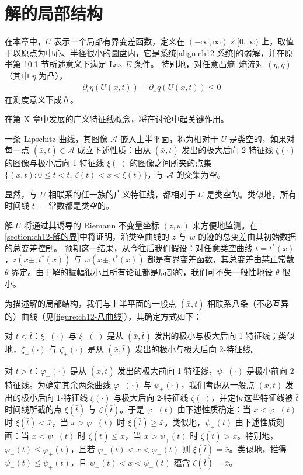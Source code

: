 \documentclass[../../main.tex]{subfiles}
\begin{document}
\section{解的局部结构}\label{section:ch12-解的局部结构}

在本章中，$U$ 表示一个局部有界变差函数，定义在 $(-\infty,\infty)\times[0,\infty)$ 上，取值于以原点为中心、半径很小的圆盘内，它是系统\eqref{align:ch12-系统}的弱解，并在原书第 10.1 节所述意义下满足 Lax $E$-条件。
特别地，对任意凸熵--熵流对 $(\eta,q)$（其中 $\eta$ 为凸），
\begin{align}
\partial_t\eta(U(x,t))+\partial_x q(U(x,t))\leqslant 0
\label{align:ch12-熵不等式}
\end{align}
在测度意义下成立。

在第 X 章中发展的广义特征线概念，将在讨论中起关键作用。

\begin{definition}[类空曲线]\label{definition:ch12-类空曲线}
一条 Lipschitz 曲线，其图像 $\mathscr{A}$ 嵌入上半平面，称为相对于 $U$ 是类空的，如果对每一点 $(\bar x,\bar t)\in\mathscr{A}$ 成立下述性质：由从 $(\bar x,\bar t)$ 发出的极大后向 2-特征线 $\zeta(\cdot)$ 的图像与极小后向 1-特征线 $\xi(\cdot)$ 的图像之间所夹的点集 $\{(x,t):0\leqslant t<\bar t,\ \zeta(t)<x<\xi(t)\}$，与 $\mathscr{A}$ 的交集为空。
\end{definition}

显然，与 $U$ 相联系的任一族的广义特征线，都相对于 $U$ 是类空的。类似地，所有时间线 $t=$ 常数都是类空的。

解 $U$ 将通过其诱导的 Riemann 不变量坐标 $(z,w)$ 来方便地监测。在\cref{section:ch12-解的界}中将证明，沿类空曲线的 $z$ 与 $w$ 的迹的总变差由其初始数据的总变差控制。
预期这一结果，从今往后我们假设：对任意类空曲线 $t=t^*(x)$，$z(x\pm,t^*(x))$ 与 $w(x\pm,t^*(x))$ 都是有界变差函数，其总变差由某正常数 $\theta$ 界定。由于解的振幅很小且所有论证都是局部的，我们可不失一般性地设 $\theta$ 很小。

为描述解的局部结构，我们与上半平面的一般点 $(\bar x,\bar t)$ 相联系八条（不必互异的）曲线（见\cref{figure:ch12-八曲线}），其确定方式如下：

对 $t<\bar t$：$\xi_-(\cdot)$ 与 $\xi_+(\cdot)$ 是从 $(\bar x,\bar t)$ 发出的极小与极大后向 1-特征线；类似地，$\zeta_-(\cdot)$ 与 $\zeta_+(\cdot)$ 是从 $(\bar x,\bar t)$ 发出的极小与极大后向 2-特征线。

对 $t>\bar t$：$\varphi_+(\cdot)$ 是从 $(\bar x,\bar t)$ 发出的极大前向 1-特征线，$\psi_-(\cdot)$ 是极小前向 2-特征线。为确定其余两条曲线 $\varphi_-(\cdot)$ 与 $\psi_+(\cdot)$，我们考虑从一般点 $(x,t)$ 发出的极小后向 1-特征线 $\xi(\cdot)$ 与极大后向 2-特征线 $\zeta(\cdot)$，并定位这些特征线被 $\bar t$ 时间线所截的点 $\xi(\bar t)$ 与 $\zeta(\bar t)$。于是 $\varphi_-(t)$ 由下述性质确定：当 $x<\varphi_-(t)$ 时 $\xi(\bar t)<\bar x$，当 $x>\varphi_-(t)$ 时 $\xi(\bar t)\geqslant\bar x$。类似地，$\psi_+(t)$ 由下述性质刻画：当 $x<\psi_+(t)$ 时 $\zeta(\bar t)\leqslant\bar x$，当 $x>\psi_+(t)$ 时 $\zeta(\bar t)>\bar x$。特别地，$\varphi_-(t)\leqslant\varphi_+(t)$，且若 $\varphi_-(t)<x<\varphi_+(t)$ 则 $\xi(\bar t)=\bar x$。类似地，推得 $\psi_-(t)\leqslant\psi_+(t)$，且 $\psi_-(t)<x<\psi_+(t)$ 蕴含 $\zeta(\bar t)=\bar x$。
\end{document}

